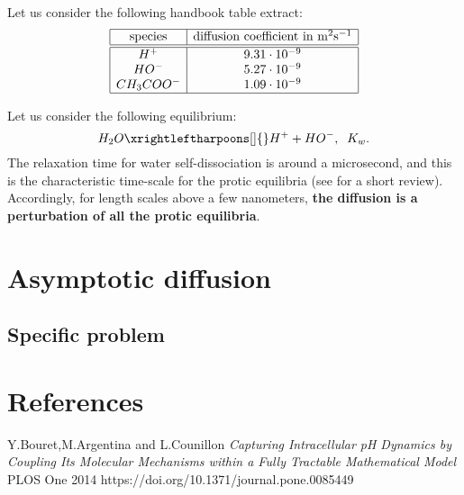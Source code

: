 \documentclass[aps,12pt]{revtex4}
\begin{document}
Let us consider the following handbook table extract:
\begin{equation}
\label{tab:diff}
\begin{array}{|c|c|}
\hline
\text{species} & \text{diffusion coefficient in } \text{m}^2\text{s}^{-1} \\
\hline
\hline
H^+ & 9.31 \cdot 10^{-9} \\
HO^- & 5.27 \cdot 10^{-9} \\
CH_3COO^- & 1.09 \cdot 10^{-9}\\
\hline
\end{array}
\end{equation}

Let us consider the following equilibrium:
\begin{equation}
\label{eq:water}
H_2O \xrightleftharpoons[]{} H^+ + HO^-, \;\; K_w.
\end{equation}
The relaxation time for water self-dissociation is around a microsecond, and this is the characteristic time-scale
for the protic equilibria (see \cite{PLOS} for a short review).
Accordingly, for length scales above a few nanometers, \textbf{the diffusion is a perturbation of all the protic equilibria}.

\section{Asymptotic diffusion}

\subsection{Specific problem}



\section{References}
\begin{thebibliography}{1}

	Y.Bouret,M.Argentina and L.Counillon
	\textit{Capturing Intracellular pH Dynamics by Coupling Its Molecular Mechanisms within a Fully Tractable Mathematical Model}
	PLOS One 2014
	https://doi.org/10.1371/journal.pone.0085449

\end{thebibliography}
\end{document}
